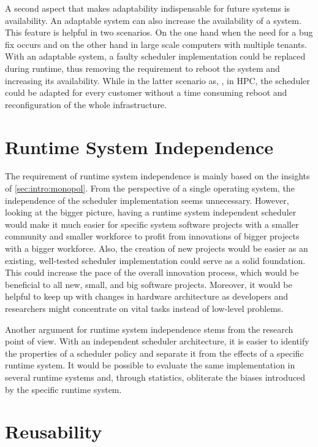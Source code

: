 A second aspect that makes adaptability indispensable for future systems is availability. An adaptable system can also increase the availability of a system. This feature is helpful in two scenarios. On the one hand when the need for a bug fix occurs and on the other hand in large scale computers with multiple tenants. With an adaptable system, a faulty scheduler implementation could be replaced during runtime, thus removing the requirement to reboot the system and increasing its availability. While in the latter scenario as, \eg, in \ac{HPC}, the scheduler could be adapted for every customer without a time consuming reboot and reconfiguration of the whole infrastructure.

\section{Runtime System Independence}%
\label{sec:requirements:independence}

The requirement of runtime system independence is mainly based on the insights of \cref{sec:intro:monopol}. From the perspective of a single operating system, the independence of the scheduler implementation seems unnecessary. However, looking at the bigger picture, having a runtime system independent scheduler would make it much easier for specific system software projects with a smaller community and smaller workforce to profit from innovations of bigger projects with a bigger workforce. Also, the creation of new projects would be easier as an existing, well-tested scheduler implementation could serve as a solid foundation. This could increase the pace of the overall innovation process, which would be beneficial to all new, small, and big software projects. Moreover, it would be helpful to keep up with changes in hardware architecture as developers and researchers might concentrate on vital tasks instead of low-level problems.

Another argument for runtime system independence stems from the research point of view. With an independent scheduler architecture, it is easier to identify the properties of a scheduler policy and separate it from the effects of a specific runtime system. It would be possible to evaluate the same implementation in several runtime systems and, through statistics, obliterate the biases introduced by the specific runtime system.

\section{Reusability}

